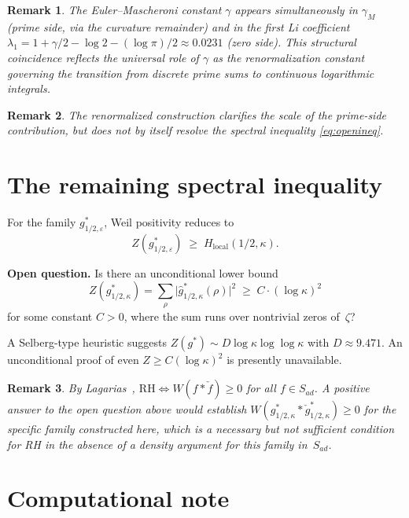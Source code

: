 \documentclass[11pt]{article}
\newtheorem*{remark*}{Remark}
\begin{document}
\begin{remark*}
The Euler--Mascheroni constant $\gamma$ appears simultaneously
in $\gamma_M$ (prime side, via the curvature remainder) and in the
first Li coefficient
$\lambda_1 = 1 + \gamma/2 - \log 2 - (\log\pi)/2 \approx 0.0231$
(zero side). This structural coincidence reflects the universal role
of $\gamma$ as the renormalization constant governing the transition
from discrete prime sums to continuous logarithmic integrals.
\end{remark*}

\begin{remark*}
The renormalized construction clarifies the scale of the prime-side
contribution, but does not by itself resolve the spectral inequality
\eqref{eq:openineq}.
\end{remark*}

\section{The remaining spectral inequality}\label{sec:open}

For the family $g^*_{1/2,\varepsilon}$, Weil positivity reduces to
\begin{equation}\label{eq:openineq}
Z(g^*_{1/2,\varepsilon})
\;\ge\;
H_{\mathrm{local}}(1/2,\kappa).
\end{equation}

\textbf{Open question.}
Is there an unconditional lower bound
\[
Z(g^*_{1/2,\kappa})
= \sum_{\rho}\bigl|\widehat g^*_{1/2,\kappa}(\rho)\bigr|^2
\;\ge\;
C\cdot(\log\kappa)^2
\]
for some constant $C>0$, where the sum runs over nontrivial zeros of~$\zeta$?

A Selberg-type heuristic suggests $Z(g^*)\sim D\log\kappa\log\log\kappa$
with $D\approx 9.471$. An unconditional proof of even
$Z\ge C(\log\kappa)^2$ is presently unavailable.

\begin{remark*}
By Lagarias~\cite{lagarias},
$\mathrm{RH} \iff W(f*\check f)\ge 0$ for all $f\in S_{ad}$.
A positive answer to the open question above would establish
$W(g^*_{1/2,\kappa}*\check g^*_{1/2,\kappa})\ge 0$ for the specific
family constructed here, which is a necessary but not sufficient
condition for RH in the absence of a density argument for this
family in~$S_{ad}$.
\end{remark*}

\section*{Computational note}
\end{document}
